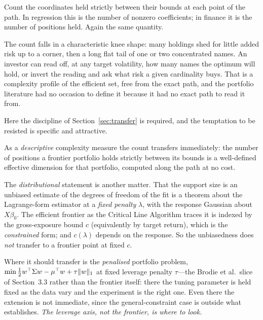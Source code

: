 Count the coordinates held strictly between their bounds at each point of the path.
In regression this is the number of nonzero coefficients; in finance it is the
number of positions held. Again the same quantity.

The count falls in a characteristic knee shape: many holdings shed for little added
risk up to a corner, then a long flat tail of one or two concentrated names. An
investor can read off, at any target volatility, how many names the optimum will
hold, or invert the reading and ask what risk a given cardinality buys. That is a
complexity profile of the efficient set, free from the exact path, and the portfolio
literature had no occasion to define it because it had no exact path to read it from.

Here the discipline of Section~\ref{sec:transfer} is required, and the temptation to
be resisted is specific and attractive.

\begin{remark}
\label{rem:df}
As a \emph{descriptive} complexity measure the count transfers immediately: the
number of positions a frontier portfolio holds strictly between its bounds is a
well-defined effective dimension for that portfolio, computed along the path at no
cost.

The \emph{distributional} statement is another matter. That the support size is an
unbiased estimate of the degrees of freedom of the fit
\cite{zou2007df,tibshirani2012df} is a theorem about the Lagrange-form estimator at a
\emph{fixed penalty} $\lambda$, with the response Gaussian about $X\beta_0$. The
efficient frontier as the Critical Line Algorithm traces it is indexed by the
gross-exposure bound $c$ (equivalently by target return), which is the
\emph{constrained} form; and $c(\lambda)$ depends on the response. So the unbiasedness
does \emph{not} transfer to a frontier point at fixed $c$.

Where it should transfer is the \emph{penalised} portfolio problem,
$\min \tfrac12 w^{\top}\Sigma w - \mu^{\top} w + \tau\lVert w \rVert_1$ at fixed leverage penalty
$\tau$---the Brodie et al.\ slice of Section~3.3 rather than the frontier itself:
there the tuning parameter is held fixed as the data vary and the experiment is the
right one. Even there the extension is not immediate, since the general-constraint
case is outside what \cite{tibshirani2012df} establishes. \emph{The leverage axis, not
the frontier, is where to look.}
\end{remark}

